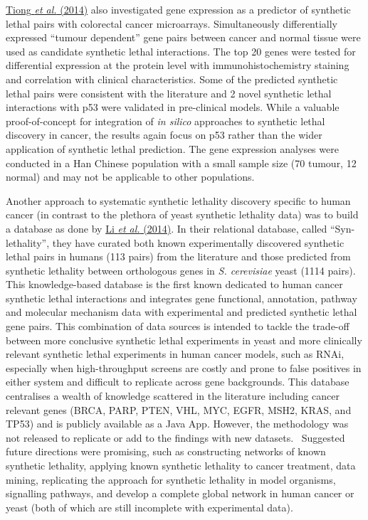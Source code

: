 \hyperlink{ENREF95}{Tiong}\hyperlink{ENREF95}{\textit{ et
al.}}\hyperlink{ENREF95}{ (2014)} also investigated gene expression as
a predictor of synthetic lethal pairs with colorectal cancer
microarrays. Simultaneously differentially expressed
{\textquotedblleft}tumour dependent{\textquotedblright} gene pairs
between cancer and normal tissue were used as candidate synthetic
lethal interactions. The top 20 genes were tested for differential
expression at the protein level with immunohistochemistry staining and
correlation with clinical characteristics. Some of the predicted
synthetic lethal pairs were consistent with the literature and 2 novel
synthetic lethal interactions with p53 were validated in pre-clinical
models. While a valuable proof-of-concept for integration of
\textit{in silico} approaches to synthetic lethal discovery in cancer,
the results again focus on p53 rather than the wider application of
synthetic lethal prediction. The gene expression analyses were
conducted in a Han Chinese population with a small sample size (70
tumour, 12 normal) and may not be applicable to other populations. 


Another approach to systematic synthetic lethality discovery specific to
human cancer (in contrast to the plethora of yeast synthetic lethality
data) was to build a database as done by
\hyperlink{ENREF69}{Li}\hyperlink{ENREF69}{\textit{ et
al.}}\hyperlink{ENREF69}{ (2014)}. In their relational database,
called {\textquotedblleft}Syn-lethality{\textquotedblright}, they have
curated both known experimentally discovered synthetic lethal pairs in
humans (113 pairs) from the literature and those predicted from
synthetic lethality between orthologous genes in \textit{S. cerevisiae}
yeast (1114 pairs). This knowledge-based database is the first known
dedicated to human cancer synthetic lethal interactions and integrates
gene functional, annotation, pathway and molecular mechanism data with
experimental and predicted synthetic lethal gene pairs. This
combination of data sources is intended to tackle the trade-off between
more conclusive synthetic lethal experiments in yeast and more
clinically relevant synthetic lethal experiments in human cancer
models, such as RNAi, especially when high-throughput screens are
costly and prone to false positives in either system and difficult to
replicate across gene backgrounds. This database centralises a wealth
of knowledge scattered in the literature including cancer relevant
genes (BRCA, PARP, PTEN, VHL, MYC, EGFR, MSH2, KRAS, and TP53) and is
publicly available as a Java App. However, the methodology was not
released to replicate or add to the findings with new datasets.
\ Suggested future directions were promising, such as constructing
networks of known synthetic lethality, applying known synthetic
lethality to cancer treatment, data mining, replicating the approach
for synthetic lethality in model organisms, signalling pathways, and
develop a complete global network in human cancer or yeast (both of
which are still incomplete with experimental data). 


